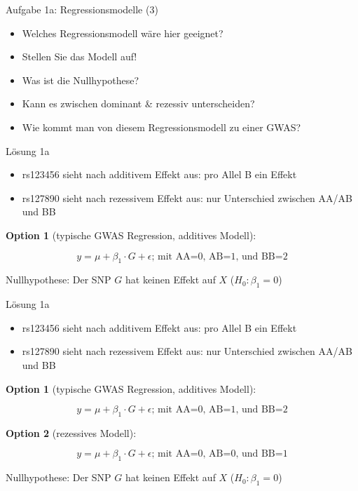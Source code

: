 \documentclass{beamer}
\begin{document}
\begin{frame}{Aufgabe 1a: Regressionsmodelle (3)}
\begin{itemize}
    \item Welches Regressionsmodell wäre hier geeignet?
    \item Stellen Sie das Modell auf! 
    \item Was ist die Nullhypothese?
    \item Kann es zwischen dominant \& rezessiv unterscheiden?
    \item Wie kommt man von diesem Regressionsmodell zu einer GWAS?
\end{itemize}
\end{frame}

\begin{frame}{Lösung 1a}
\begin{itemize}
    \item rs123456 sieht nach additivem Effekt aus: pro Allel B ein Effekt
    \item rs127890 sieht nach rezessivem Effekt aus: nur Unterschied zwischen AA/AB und BB
\end{itemize}

\textbf{Option 1} (typische GWAS Regression, additives Modell):

$$ y = \mu + \beta_1 \cdot G + \epsilon \text{; mit AA=0, AB=1, und BB=2}$$

Nullhypothese: Der SNP $G$ hat keinen Effekt auf $X$ ($H_0: \beta_1 = 0$)

\end{frame}

\begin{frame}{Lösung 1a}
\begin{itemize}
    \item rs123456 sieht nach additivem Effekt aus: pro Allel B ein Effekt
    \item rs127890 sieht nach rezessivem Effekt aus: nur Unterschied zwischen AA/AB und BB
\end{itemize}

\textbf{Option 1} (typische GWAS Regression, additives Modell):

$$ y = \mu + \beta_1 \cdot G + \epsilon \text{; mit AA=0, AB=1, und BB=2}$$

\textbf{Option 2} (rezessives Modell):

$$ y = \mu + \beta_1 \cdot G + \epsilon \text{; mit AA=0, AB=0, und BB=1}$$

Nullhypothese: Der SNP $G$ hat keinen Effekt auf $X$ ($H_0: \beta_1 = 0$)

\end{frame}
\end{document}
